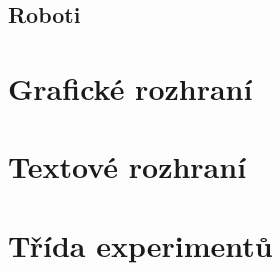 \subsection{Roboti} \label{imp:robots}

\section{Grafické rozhraní} \label{imp:GUI}

\section{Textové rozhraní} \label{imp:TUI}

\section{Třída experimentů} \label{imp:experimentsetter}

